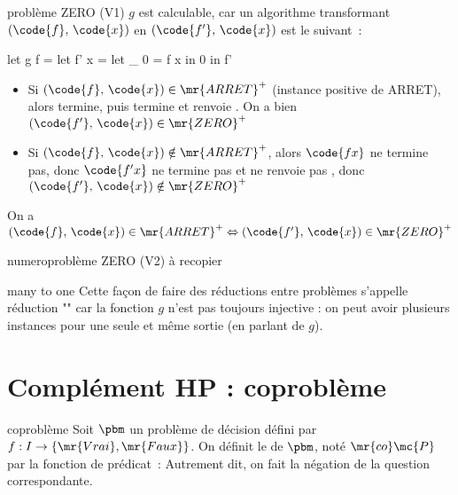\begin{adjustwidth}{-3cm}{-3cm}
\begin{exemple}{}{problème ZERO (V1)}
    $g$ est calculable, car un algorithme transformant $(\code{f},\, \code{x})$ en $(\code{f'},\, \code{x})$ est le suivant~:
    \begin{lstLNat}
    let g f =
        let f' x = let _ 0 = f x in 0
        in f'
    \end{lstLNat}
    \begin{itemize}
        \item Si $(\code{f},\, \code{x}) \in \mr{ARRET}^+$ (instance positive de ARRET), alors  termine, puis  termine et renvoie . On a bien $(\code{f'},\, \code{x}) \in \mr{ZERO}^+$
        \item Si $(\code{f},\, \code{x}) \notin \mr{ARRET}^+$, alors $\code{f x}$ ne termine pas, donc $\code{f' x}$ ne termine pas et ne renvoie pas , donc $(\code{f'},\, \code{x}) \notin \mr{ZERO}^+$
    \end{itemize}
    On a $(\code{f},\, \code{x}) \in \mr{ARRET}^+ \Leftrightarrow (\code{f'},\, \code{x}) \in \mr{ZERO}^+$
\end{exemple}

\begin{exemple}{numero}{problème ZERO (V2)}
    à recopier
\end{exemple}

\begin{remarque}{}{many to one}
    Cette façon de faire des réductions entre problèmes s'appelle réduction "" car la fonction $g$ n'est pas toujours injective : on peut avoir plusieurs instances pour une seule et même sortie (en parlant de $g$).
\end{remarque}

\section{Complément HP : coproblème}

\newcommand{\copbm}[]{\mr{co}\mc{P}}


\begin{definition}{}{coproblème}
    Soit $\pbm$ un problème de décision défini par $f:I \to \{\mr{Vrai},\mr{Faux}\}$. On définit le  de $\pbm$, noté $\copbm$ par la fonction de prédicat~:
    Autrement dit, on fait la négation de la question correspondante.
\end{definition}


\end{adjustwidth}
